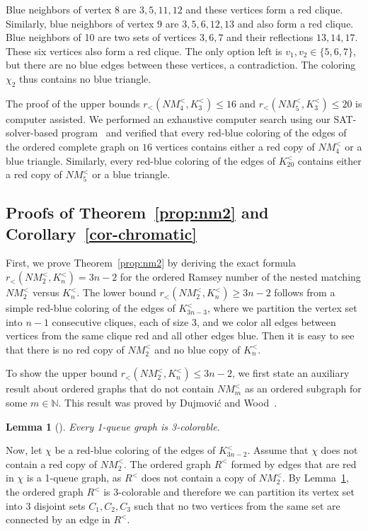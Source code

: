 \documentclass[11pt,a4paper]{article}
\newtheorem{lemma}[thm]{Lemma}
\theoremstyle{remark}
\begin{document}
Blue neighbors of vertex 8 are $3,5,11,12$ and these vertices form a red clique.
Similarly, blue neighbors of vertex 9 are $3,5,6,12,13$ and also form a red clique.
Blue neighbors of 10 are two sets of vertices $3,6,7$ and their reflections $13,14,17$.
These six vertices also form a red clique.
The only option left is $v_1,v_2\in\{5,6,7\}$, but there are no blue edges between these vertices, a contradiction.
The coloring $\chi_2$ thus contains no blue triangle.

The proof of the upper bounds $r_<(NM^<_4,K^<_3) \leq 16$ and $r_<(NM^<_5,K^<_3) \leq 20$ is computer assisted.
We performed an exhaustive computer search using our SAT-solver-based program~\cite{utility} and verified that every red-blue coloring of the edges of the ordered complete graph on $16$ vertices contains either a red copy of $NM_4^<$ or a blue triangle.
Similarly, every red-blue coloring of the edges of $K^<_{20}$ contains either a red copy of $NM_5^<$ or a blue triangle.






 
\subsection{Proofs of Theorem~\ref{prop:nm2} and Corollary~\ref{cor-chromatic}}
\label{subsec-nm2}

First, we prove Theorem~\ref{prop:nm2} by deriving the exact formula $r_<(NM_2^<,K^<_n) = 3n-2$ for the ordered Ramsey number of the nested matching $NM^<_2$ versus $K^<_n$.
The lower bound $r_<(NM_2^<,K^<_n) \geq 3n-2$ follows from a simple red-blue coloring of the edges of $K^<_{3n-3}$, where we partition the vertex set into $n-1$ consecutive cliques, each of size 3, and we color all edges between vertices from the same clique red and all other edges blue.
Then it is easy to see that there is no red copy of $NM^<_2$ and no blue copy of $K^<_n$.

To show the upper bound $r_<(NM_2^<,K^<_n) \leq 3n-2$, we first state an auxiliary result about ordered graphs that do not contain $NM^<_m$ as an ordered subgraph for some $m \in \mathbb{N}$.
This result was proved by Dujmović and Wood~\cite{dujWoo10}.

\begin{lemma}[\cite{dujWoo10}]
\label{lem-1queue}
Every 1-queue graph is 3-colorable.
\end{lemma}

Now, let $\chi$ be a red-blue coloring of the edges of $K^<_{3n-2}$.
Assume that $\chi$ does not contain a red copy of $NM^<_2$.
The ordered graph $R^<$ formed by edges that are red in $\chi$ is a 1-queue graph, as $R^<$ does not contain a copy of $NM^<_2$.
By Lemma~\ref{lem-1queue}, the ordered graph $R^<$ is 3-colorable and therefore we can partition its vertex set into 3 disjoint sets $C_1,C_2,C_3$ such that no two vertices from the same set are connected by an edge in $R^<$.
\end{document}
